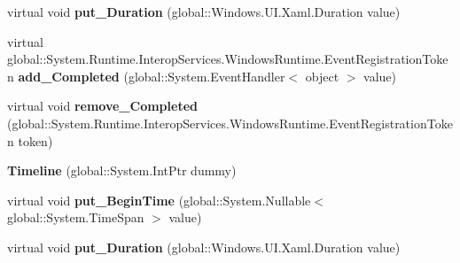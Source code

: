 \begin{DoxyCompactItemize}
\item 
\mbox{\label{class_windows_1_1_u_i_1_1_xaml_1_1_media_1_1_animation_1_1_timeline_ad18ba23ca70f9feb87ff33751276ed17}} 
virtual void {\bfseries put\+\_\+\+Duration} (global\+::\+Windows.\+U\+I.\+Xaml.\+Duration value)
\item 
\mbox{\label{class_windows_1_1_u_i_1_1_xaml_1_1_media_1_1_animation_1_1_timeline_a06df3c15f47b53c7bde83e2c99016be0}} 
virtual global\+::\+System.\+Runtime.\+Interop\+Services.\+Windows\+Runtime.\+Event\+Registration\+Token {\bfseries add\+\_\+\+Completed} (global\+::\+System.\+Event\+Handler$<$ object $>$ value)
\item 
\mbox{\label{class_windows_1_1_u_i_1_1_xaml_1_1_media_1_1_animation_1_1_timeline_abd69089a61fd390f3e7496347cf7afbd}} 
virtual void {\bfseries remove\+\_\+\+Completed} (global\+::\+System.\+Runtime.\+Interop\+Services.\+Windows\+Runtime.\+Event\+Registration\+Token token)
\item 
\mbox{\label{class_windows_1_1_u_i_1_1_xaml_1_1_media_1_1_animation_1_1_timeline_ad9fb777f9fbd5b9e59022ab3cbcde141}} 
{\bfseries Timeline} (global\+::\+System.\+Int\+Ptr dummy)
\item 
\mbox{\label{class_windows_1_1_u_i_1_1_xaml_1_1_media_1_1_animation_1_1_timeline_aae3a485326665861681d7ef24e8bed71}} 
virtual void {\bfseries put\+\_\+\+Begin\+Time} (global\+::\+System.\+Nullable$<$ global\+::\+System.\+Time\+Span $>$ value)
\item 
\mbox{\label{class_windows_1_1_u_i_1_1_xaml_1_1_media_1_1_animation_1_1_timeline_ad18ba23ca70f9feb87ff33751276ed17}} 
virtual void {\bfseries put\+\_\+\+Duration} (global\+::\+Windows.\+U\+I.\+Xaml.\+Duration value)
\item 
\mbox{\label{class_windows_1_1_u_i_1_1_xaml_1_1_media_1_1_animation_1_1_timeline_a06df3c15f47b53c7bde83e2c99016be0}} 

\end{DoxyCompactItemize}

